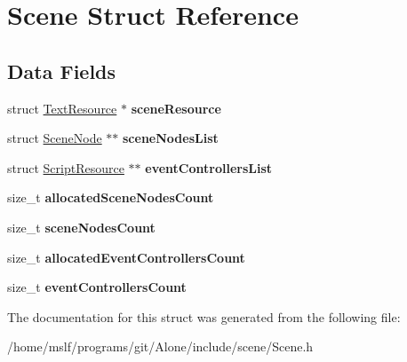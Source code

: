 \hypertarget{struct_scene}{}\section{Scene Struct Reference}
\label{struct_scene}
\subsection*{Data Fields}
\begin{DoxyCompactItemize}
\item 
\hypertarget{struct_scene_a21ff815316283aacca9aa1a2946f2e44}{}\label{struct_scene_a21ff815316283aacca9aa1a2946f2e44} 
struct \hyperlink{struct_text_resource}{Text\+Resource} $\ast$ {\bfseries scene\+Resource}
\item 
\hypertarget{struct_scene_a5c2a731f55f56cdcfa5c21e60ccbb6e4}{}\label{struct_scene_a5c2a731f55f56cdcfa5c21e60ccbb6e4} 
struct \hyperlink{struct_scene_node}{Scene\+Node} $\ast$$\ast$ {\bfseries scene\+Nodes\+List}
\item 
\hypertarget{struct_scene_ad4b3987f8cf701755a371f80578a908d}{}\label{struct_scene_ad4b3987f8cf701755a371f80578a908d} 
struct \hyperlink{struct_script_resource}{Script\+Resource} $\ast$$\ast$ {\bfseries event\+Controllers\+List}
\item 
\hypertarget{struct_scene_a07444dae294959bed34558e3477a76c6}{}\label{struct_scene_a07444dae294959bed34558e3477a76c6} 
size\+\_\+t {\bfseries allocated\+Scene\+Nodes\+Count}
\item 
\hypertarget{struct_scene_a11cef9a0dcadd4d0fb4b18f1f214fed0}{}\label{struct_scene_a11cef9a0dcadd4d0fb4b18f1f214fed0} 
size\+\_\+t {\bfseries scene\+Nodes\+Count}
\item 
\hypertarget{struct_scene_a6140a3bd288e2079c3f28f30246c41a6}{}\label{struct_scene_a6140a3bd288e2079c3f28f30246c41a6} 
size\+\_\+t {\bfseries allocated\+Event\+Controllers\+Count}
\item 
\hypertarget{struct_scene_ab2cf0332471e9bed9ab7792892fafbf0}{}\label{struct_scene_ab2cf0332471e9bed9ab7792892fafbf0} 
size\+\_\+t {\bfseries event\+Controllers\+Count}
\end{DoxyCompactItemize}


The documentation for this struct was generated from the following file\+:\begin{DoxyCompactItemize}
\item 
/home/mslf/programs/git/\+Alone/include/scene/Scene.\+h\end{DoxyCompactItemize}
